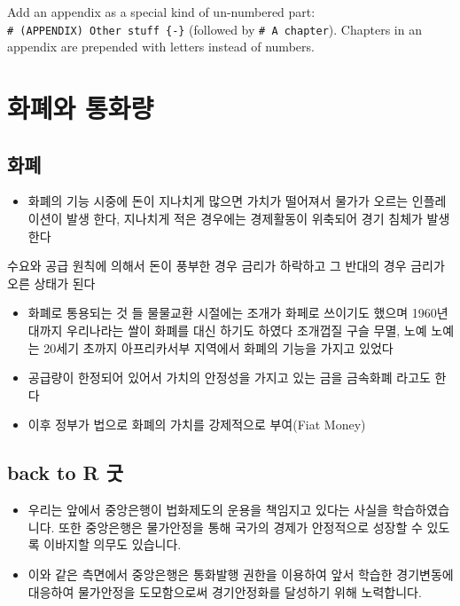 \documentclass[
]{book}
\providecommand{\tightlist}{%
  \setlength{\itemsep}{0pt}\setlength{\parskip}{0pt}}
\begin{document}
Add an appendix as a special kind of un-numbered part: \texttt{\#\ (APPENDIX)\ Other\ stuff\ \{-\}} (followed by \texttt{\#\ A\ chapter}). Chapters in an appendix are prepended with letters instead of numbers.

\hypertarget{uxd654uxd3d0uxc640-uxd1b5uxd654uxb7c9}{%
\chapter{화폐와 통화량}\label{uxd654uxd3d0uxc640-uxd1b5uxd654uxb7c9}}

\hypertarget{uxd654uxd3d0}{%
\section{화폐}\label{uxd654uxd3d0}}

\begin{itemize}
\tightlist
\item
  화폐의 기능
  시중에 돈이 지나치게 많으면 가치가 떨어져서 물가가 오르는 인플레이션이 발생 한다, 지나치게 적은 경우에는 경제활동이 위축되어 경기 침체가 발생 한다
\end{itemize}

수요와 공급 원칙에 의해서 돈이 풍부한 경우 금리가 하락하고 그 반대의 경우 금리가 오른 상태가 된다

\begin{itemize}
\tightlist
\item
  화폐로 통용되는 것 들
  물물교환 시절에는 조개가 화페로 쓰이기도 했으며 1960년대까지 우리나라는 쌀이 화폐를 대신 하기도 하였다
  조개껍질 구슬 무멸, 노예
  노예는 20세기 초까지 아프리카서부 지역에서 화폐의 기능을 가지고 있었다
\item
  공급량이 한정되어 있어서 가치의 안정성을 가지고 있는 금을 금속화폐 라고도 한다
\item
  이후 정부가 법으로 화폐의 가치를 강제적으로 부여(Fiat Money)
\end{itemize}

\hypertarget{back-to-r-uxad7f}{%
\section{back to R 굿}\label{back-to-r-uxad7f}}

\begin{itemize}
\tightlist
\item
  우리는 앞에서 중앙은행이 법화제도의 운용을 책임지고 있다는 사실을 학습하였습니다. 또한 중앙은행은 물가안정을 통해 국가의 경제가 안정적으로 성장할 수 있도록 이바지할 의무도 있습니다.\\
\item
  이와 같은 측면에서 중앙은행은 통화발행 권한을 이용하여 앞서 학습한 경기변동에 대응하여 물가안정을 도모함으로써 경기안정화를 달성하기 위해 노력합니다.
\end{itemize}
\end{document}
